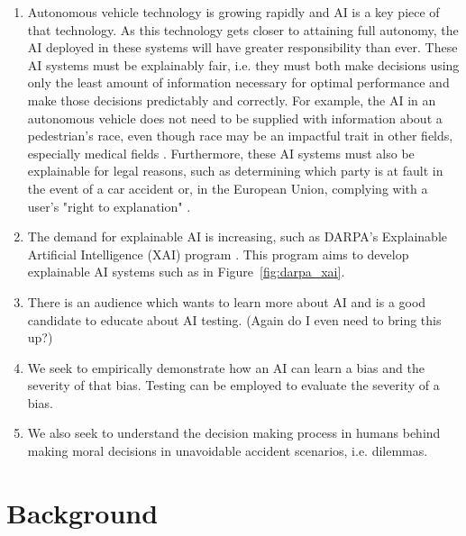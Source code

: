\documentclass{report}
\begin{document}
\begin{enumerate}
    \item Autonomous vehicle technology is growing rapidly and AI is a key piece of that technology.
    As this technology gets closer to attaining full autonomy, the AI deployed in these systems will
    have greater responsibility than ever. These AI systems must be explainably fair, i.e. they must
    both make decisions using only the least amount of information necessary for optimal performance
    and make those decisions predictably and correctly. For example, the AI in an autonomous vehicle
    does not need to be supplied with information about a pedestrian's race, even though race may be
    an impactful trait in other fields, especially medical fields \cite{sickeCellDisease}.
    Furthermore, these AI systems must also be explainable for legal reasons, such as determining
    which party is at fault in the event of a car accident or, in the European Union, complying with
    a user's "right to explanation" \cite{goodman2017european}.
    
    \item The demand for explainable AI is increasing, such as DARPA's Explainable Artificial
    Intelligence (XAI) program \cite{gunning2016explainable}. This program aims to develop
    explainable AI systems such as in Figure~\ref{fig:darpa_xai}.
    
    \item There is an audience which wants to learn more about AI and is a good candidate to educate
    about AI testing. (Again do I even need to bring this up?)
    
    \item We seek to empirically demonstrate how an AI can learn a bias and the severity of that
    bias. Testing can be employed to evaluate the severity of a bias.

    \item We also seek to understand the decision making process in humans behind making moral
    decisions in unavoidable accident scenarios, i.e. dilemmas.
\end{enumerate}

\chapter{Background}
\end{document}
